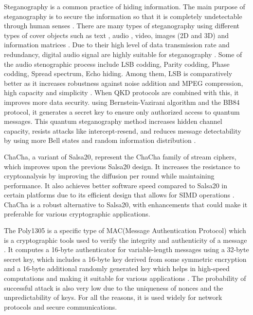 \documentclass[a4paper]{cas-sc}
\begin{document}
Steganography is a common practice of hiding information. The main purpose of steganography is to secure the information so that it is completely undetectable through human senses \cite{amin2003information}. There are many types of steganography using different types of cover objects such as text \cite{yang2018rnn}, audio \cite{jayaram2011information}\cite{hemeida2021comparative}\cite{djebbar2012comparative}, video, images (2D and 3D) \cite{farrag2020secure} and information matrices \cite{mashaly2019multiple}. Due to their high level of data transmission rate and redundancy, digital audio signal are highly suitable for steganography \cite{singh2014survey}. Some of the audio stenographic process include LSB codding, Parity codding, Phase codding, Spread spectrum, Echo hiding. Among them, LSB is comparatively better as it increases robustness against noise addition and MPEG compression, high capacity and simplicity \cite{cvejic2004increasing}\cite{jayaram2011information}. When QKD protocols are combined with this, it improves more data security. using  Bernstein-Vazirani algorithm and the BB84 protocol, it generates a secret key to ensure only authorized access to quantum messages. This quantum steganography method increases hidden channel capacity, resists attacks like intercept-resend, and reduces message detectability by using more Bell states and random information distribution \cite{yalla2022novel}.

ChaCha, a variant of Salsa20, represent the ChaCha family of stream ciphers, which improves upon the previous Salsa20 design. It increases the resistance to cryptoanalysis by improving the diffusion per round while maintaining performance. It also achieves better software speed compared to Salsa20 in certain platforms due to its efficient design that allows for SIMD operations \cite{bernstein2008chacha}. ChaCha is a robust alternative to Salsa20, with enhancements that could make it preferable for various cryptographic applications.

The Poly1305 is a specific type of MAC(Message Authentication Protocol) which is a cryptographic tools used to verify the integrity and authenticity of a message \cite{bernstein2005poly1305}. It computes a 16-byte authenticator for variable-length messages using a 32-byte secret key, which includes a 16-byte key derived from some symmetric encryption and a 16-byte additional randomly generated key which helps in high-speed computations and making it suitable for various applications \cite{bernstein2005poly1305}. The probability of successful attack is also very low due to the uniqueness of nonces and the unpredictability of keys. For all the reasons, it is used widely for network protocols and secure communications.
\end{document}
